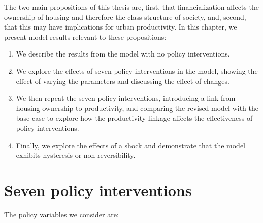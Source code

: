 The two main propositions of this thesis are, first, that financialization affects the ownership of housing and therefore the class structure of society, and, second, that this may have implications for urban productivity.  In this chapter, we present model results relevant to these propositions:  
\begin{enumerate}
    \item %
    We describe the results from the model with no policy interventions. 
    \item We explore the effects of seven policy interventions in the model, %
    showing the effect of varying the parameters and discussing the effect of changes. 
    \item %
    We then repeat the seven policy interventions, introducing a link from housing ownership to productivity, and comparing the revised model with the base case to explore how the productivity linkage affects the effectiveness of policy interventions. %
     \item Finally, we explore the effects of a shock %
     and demonstrate that the model exhibits \gls{hysteresis} or non-reversibility.
     
\end{enumerate}



\section{Seven policy interventions}

The policy variables we consider are: 

